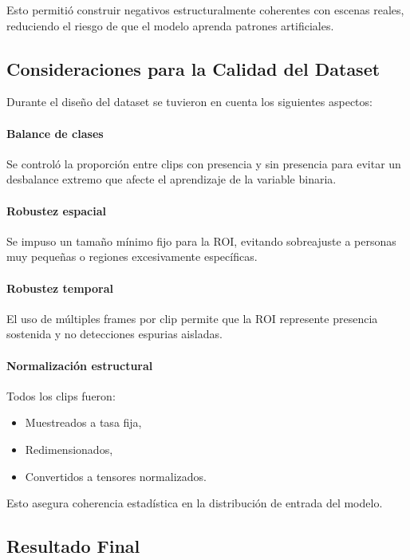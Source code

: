 \documentclass[12pt,a4paper]{article}
\begin{document}
Esto permitió construir negativos estructuralmente coherentes con escenas reales, reduciendo el riesgo de que el modelo aprenda patrones artificiales.

\subsection{Consideraciones para la Calidad del Dataset}

Durante el diseño del dataset se tuvieron en cuenta los siguientes aspectos:

\paragraph{Balance de clases}

Se controló la proporción entre clips con presencia y sin presencia para evitar un desbalance extremo que afecte el aprendizaje de la variable binaria.

\paragraph{Robustez espacial}

Se impuso un tamaño mínimo fijo para la ROI, evitando sobreajuste a personas muy pequeñas o regiones excesivamente específicas.

\paragraph{Robustez temporal}

El uso de múltiples frames por clip permite que la ROI represente presencia sostenida y no detecciones espurias aisladas.

\paragraph{Normalización estructural}

Todos los clips fueron:

\begin{itemize}
    \item Muestreados a tasa fija,
    \item Redimensionados,
    \item Convertidos a tensores normalizados.
\end{itemize}

Esto asegura coherencia estadística en la distribución de entrada del modelo.

\subsection{Resultado Final}
\end{document}
